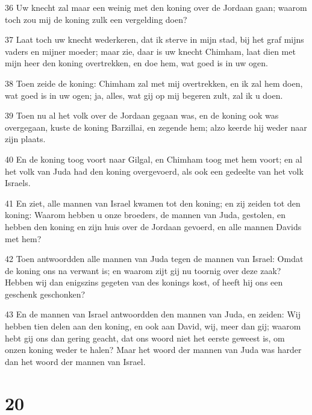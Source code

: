 \par 36 Uw knecht zal maar een weinig met den koning over de Jordaan gaan; waarom toch zou mij de koning zulk een vergelding doen?
\par 37 Laat toch uw knecht wederkeren, dat ik sterve in mijn stad, bij het graf mijns vaders en mijner moeder; maar zie, daar is uw knecht Chimham, laat dien met mijn heer den koning overtrekken, en doe hem, wat goed is in uw ogen.
\par 38 Toen zeide de koning: Chimham zal met mij overtrekken, en ik zal hem doen, wat goed is in uw ogen; ja, alles, wat gij op mij begeren zult, zal ik u doen.
\par 39 Toen nu al het volk over de Jordaan gegaan was, en de koning ook was overgegaan, kuste de koning Barzillai, en zegende hem; alzo keerde hij weder naar zijn plaats.
\par 40 En de koning toog voort naar Gilgal, en Chimham toog met hem voort; en al het volk van Juda had den koning overgevoerd, als ook een gedeelte van het volk Israels.
\par 41 En ziet, alle mannen van Israel kwamen tot den koning; en zij zeiden tot den koning: Waarom hebben u onze broeders, de mannen van Juda, gestolen, en hebben den koning en zijn huis over de Jordaan gevoerd, en alle mannen Davids met hem?
\par 42 Toen antwoordden alle mannen van Juda tegen de mannen van Israel: Omdat de koning ons na verwant is; en waarom zijt gij nu toornig over deze zaak? Hebben wij dan enigszins gegeten van des konings kost, of heeft hij ons een geschenk geschonken?
\par 43 En de mannen van Israel antwoordden den mannen van Juda, en zeiden: Wij hebben tien delen aan den koning, en ook aan David, wij, meer dan gij; waarom hebt gij ons dan gering geacht, dat ons woord niet het eerste geweest is, om onzen koning weder te halen? Maar het woord der mannen van Juda was harder dan het woord der mannen van Israel.

\chapter{20}

